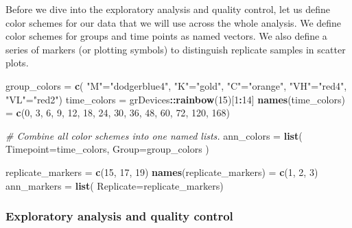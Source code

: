 \documentclass[9pt,a4paper,]{extarticle}
\newenvironment{Shaded}{\begin{snugshade}}{\end{snugshade}}
\newcommand{\CommentTok}[1]{\textcolor[rgb]{0.56,0.35,0.01}{\textit{#1}}}
\newcommand{\DataTypeTok}[1]{\textcolor[rgb]{0.13,0.29,0.53}{#1}}
\newcommand{\DecValTok}[1]{\textcolor[rgb]{0.00,0.00,0.81}{#1}}
\newcommand{\KeywordTok}[1]{\textcolor[rgb]{0.13,0.29,0.53}{\textbf{#1}}}
\newcommand{\NormalTok}[1]{#1}
\newcommand{\OperatorTok}[1]{\textcolor[rgb]{0.81,0.36,0.00}{\textbf{#1}}}
\newcommand{\StringTok}[1]{\textcolor[rgb]{0.31,0.60,0.02}{#1}}
\begin{document}
Before we dive into the exploratory analysis and quality control, let us
define color schemes for our data that we will use across the whole analysis.
We define color schemes for groups and time points as named vectors. We also
define a series of markers (or plotting symbols) to distinguish replicate
samples in scatter plots.

\begin{Shaded}
\begin{Highlighting}[]
\NormalTok{group_colors =}\StringTok{ }\KeywordTok{c}\NormalTok{(}
    \StringTok{"M"}\NormalTok{=}\StringTok{"dodgerblue4"}\NormalTok{,}
    \StringTok{"K"}\NormalTok{=}\StringTok{"gold"}\NormalTok{,}
    \StringTok{"C"}\NormalTok{=}\StringTok{"orange"}\NormalTok{,}
    \StringTok{"VH"}\NormalTok{=}\StringTok{"red4"}\NormalTok{,}
    \StringTok{"VL"}\NormalTok{=}\StringTok{"red2"}\NormalTok{)}
\NormalTok{time_colors =}\StringTok{ }\NormalTok{grDevices}\OperatorTok{::}\KeywordTok{rainbow}\NormalTok{(}\DecValTok{15}\NormalTok{)[}\DecValTok{1}\OperatorTok{:}\DecValTok{14}\NormalTok{]}
\KeywordTok{names}\NormalTok{(time_colors) =}\StringTok{ }\KeywordTok{c}\NormalTok{(}\DecValTok{0}\NormalTok{, }\DecValTok{3}\NormalTok{, }\DecValTok{6}\NormalTok{, }\DecValTok{9}\NormalTok{, }\DecValTok{12}\NormalTok{, }\DecValTok{18}\NormalTok{, }\DecValTok{24}\NormalTok{, }\DecValTok{30}\NormalTok{, }\DecValTok{36}\NormalTok{, }\DecValTok{48}\NormalTok{, }\DecValTok{60}\NormalTok{, }\DecValTok{72}\NormalTok{, }\DecValTok{120}\NormalTok{, }\DecValTok{168}\NormalTok{)}

\CommentTok{# Combine all color schemes into one named lists.}
\NormalTok{ann_colors =}\StringTok{ }\KeywordTok{list}\NormalTok{(}
    \DataTypeTok{Timepoint=}\NormalTok{time_colors,}
    \DataTypeTok{Group=}\NormalTok{group_colors}
\NormalTok{    )}

\NormalTok{replicate_markers =}\StringTok{ }\KeywordTok{c}\NormalTok{(}\DecValTok{15}\NormalTok{, }\DecValTok{17}\NormalTok{, }\DecValTok{19}\NormalTok{)}
\KeywordTok{names}\NormalTok{(replicate_markers) =}\StringTok{ }\KeywordTok{c}\NormalTok{(}\DecValTok{1}\NormalTok{, }\DecValTok{2}\NormalTok{, }\DecValTok{3}\NormalTok{)}
\NormalTok{ann_markers =}\StringTok{ }\KeywordTok{list}\NormalTok{(}
    \DataTypeTok{Replicate=}\NormalTok{replicate_markers)}
\end{Highlighting}
\end{Shaded}

\hypertarget{exploratory-analysis-and-quality-control}{%
\subsubsection{Exploratory analysis and quality control}\label{exploratory-analysis-and-quality-control}}
\end{document}

